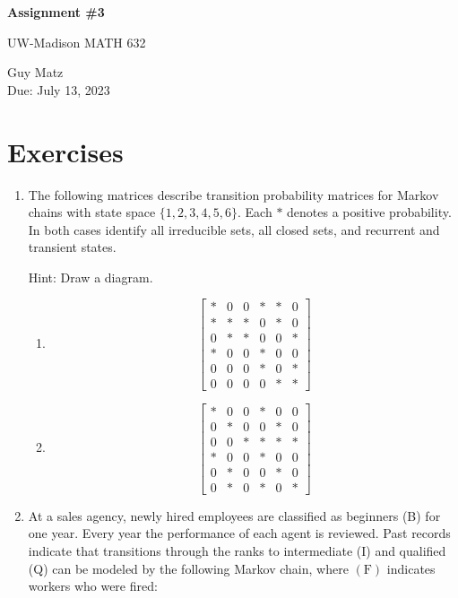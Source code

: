 \documentclass{article} %
\theoremstyle{plain}
\theoremstyle{case}
\begin{document}
\begin{center}
\Large{\textbf{Assignment \#3}
            
UW-Madison MATH 632} %
\vspace{5pt}
        
\normalsize{  Guy Matz%
        \\ Due: July 13, 2023}
\vspace{15pt}
\end{center}

\section*{Exercises}%
\begin{enumerate}[label={\fbox{\textbf{Exercise \#\arabic* :}}}]


  \item The following matrices describe transition probability matrices for Markov chains with state space $\{1,2,3,4,5,6\}$. Each $*$ denotes a positive probability. In both cases identify all irreducible sets, all closed sets, and recurrent and transient states.

Hint: Draw a diagram.

  \begin{enumerate}
  \item 
$$
\left[\begin{array}{llllll}
* & 0 & 0 & * & * & 0 \\
* & * & * & 0 & * & 0 \\
0 & * & * & 0 & 0 & * \\
* & 0 & 0 & * & 0 & 0 \\
0 & 0 & 0 & * & 0 & * \\
0 & 0 & 0 & 0 & * & *
\end{array}\right]
$$

  \item 
$$
\left[\begin{array}{llllll}
* & 0 & 0 & * & 0 & 0 \\
0 & * & 0 & 0 & * & 0 \\
0 & 0 & * & * & * & * \\
* & 0 & 0 & * & 0 & 0 \\
0 & * & 0 & 0 & * & 0 \\
0 & * & 0 & * & 0 & *
\end{array}\right]
$$
  \end{enumerate}

\newpage
  \item At a sales agency, newly hired employees are classified as beginners (B) for one year. Every year the performance of each agent is reviewed. Past records indicate that transitions through the ranks to intermediate (I) and qualified (Q) can be modeled by the following Markov chain, where $(\mathrm{F})$ indicates workers who were fired:


\end{enumerate}
\end{document}
